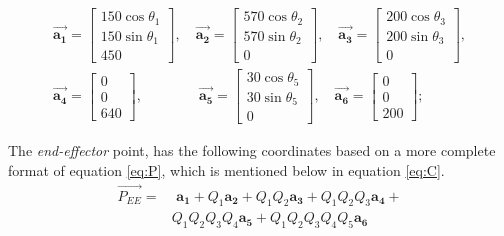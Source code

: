 \documentclass[conference]{IEEEtran}
\begin{document}
\begin{small}
\begin{align*}
         &                                        &  \\
         & \vec{\mathbf{a_1}} =
        \begin{bmatrix}
            150 \cos\theta_1 \\
            150 \sin\theta_1 \\
            450
        \end{bmatrix} , \quad
        \vec{\mathbf{a_2}} =
        \begin{bmatrix}
            570 \cos \theta_2 \\
            570 \sin \theta_2 \\
            0
        \end{bmatrix} , \quad
        \vec{\mathbf{a_3}} =
        \begin{bmatrix}
            200 \cos \theta_3 \\
            200 \sin \theta_3 \\
            0
        \end{bmatrix} ,                            \\
         & \vec{\mathbf{a_4}} =
        \begin{bmatrix}
            0 \\
            0 \\
            640
        \end{bmatrix} , \quad \quad \quad \quad
        \vec{\mathbf{a_5}} =
        \begin{bmatrix}
            30 \cos \theta_5 \\
            30 \sin \theta_5 \\
            0
        \end{bmatrix} , \quad
        \vec{\mathbf{a_6}} =
        \begin{bmatrix}
            0 \\
            0 \\
            200
        \end{bmatrix} ;
    \end{align*}
\end{small}


The \textit{end-effector} point, has the following coordinates based on a more complete format of equation \ref{eq:P}, which is mentioned below in equation \ref{eq:C}.
\begin{align}
    \vec{\mathbf{\mathit{P_{EE}}}} = & \,\, \mathbf{a_1} + Q_1 \mathbf{a_2} + Q_1 Q_2 \mathbf{a_3} + Q_1 Q_2 Q_3 \mathbf{a_4} + \label{eq:C} \\
                                     & Q_1 Q_2 Q_3 Q_4 \mathbf{a_5} + Q_1 Q_2 Q_3 Q_4 Q_5 \mathbf{a_6} \nonumber
\end{align}
\end{document}
